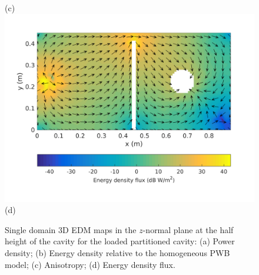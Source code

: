 \documentclass[a4paper]{article}
\numberwithin{equation}{section}
\begin{document}
\begin{figure}[ht]
\begin{center}
{\footnotesize (c)}\\
\vspace{2mm}
\includegraphics[trim={0 11mm 0 12mm},clip,width=0.55\linewidth]{figures/SDM_3D_DL_EnergyDensityFluxMap}\\
{\footnotesize (d)}\\
\vspace{-2mm}
\caption{\label{fg:partcylsdm_maps} Single domain 3D EDM maps in the $z$-normal plane at the half height of the cavity for the 
loaded partitioned cavity: (a) Power density; (b) Energy density relative to the homogeneous PWB model;
(c) Anisotropy; (d) Energy density flux.}
\end{center}
\end{figure}
\end{document}
